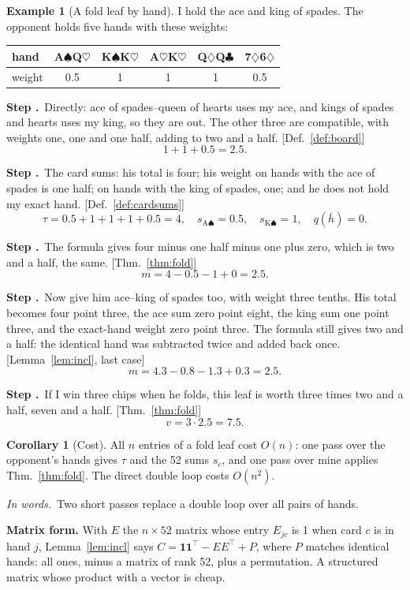 \documentclass[11pt]{article}
\newcommand{\SP}{\ensuremath{\spadesuit}}\newcommand{\HE}{\ensuremath{\heartsuit}}
\newcommand{\DI}{\ensuremath{\diamondsuit}}\newcommand{\CL}{\ensuremath{\clubsuit}}
\newcommand{\one}{\mathbf 1}
\theoremstyle{definition}
\newtheorem{example}[definition]{Example}
\newtheorem{corollary}[definition]{Corollary}
\newcommand{\inwords}{\par\smallskip\noindent\textit{In words.}\ }
\newcounter{stp}
\newcommand{\steps}{\setcounter{stp}{0}}
\newcommand{\st}{\stepcounter{stp}\par\medskip\noindent\textbf{Step \arabic{stp}.}\ }
\newcommand{\by}[1]{\hfill{\small\color{blue!50!black}[#1]}}
\newcommand{\Def}[1]{Def.~\ref{#1}}\newcommand{\Lem}[1]{Lemma~\ref{#1}}\newcommand{\Thm}[1]{Thm.~\ref{#1}}
\begin{document}
\begin{example}[A fold leaf by hand]\label{ex:fold}
I hold the ace and king of spades. The opponent holds five hands with these weights:
\begin{center}\begin{tabular}{lccccc}
\toprule hand & A\SP Q\HE & K\SP K\HE & A\HE K\HE & Q\DI Q\CL & 7\DI 6\DI\\
\midrule weight & 0.5 & 1 & 1 & 1 & 0.5\\ \bottomrule
\end{tabular}\end{center}
\steps
\st Directly: ace of spades--queen of hearts uses my ace, and kings of spades and hearts uses my king, so they are out. The
other three are compatible, with weights one, one and one half, adding to two and a half. \by{\Def{def:board}}
\[ 1+1+0.5=2.5. \]
\st The card sums: his total is four; his weight on hands with the ace of spades is one half; on hands with the king of
spades, one; and he does not hold my exact hand. \by{\Def{def:cardsums}}
\[ \tau=0.5+1+1+1+0.5=4,\quad s_{\text{A}\spadesuit}=0.5,\quad s_{\text{K}\spadesuit}=1,\quad q(\bar h)=0. \]
\st The formula gives four minus one half minus one plus zero, which is two and a half, the same. \by{\Thm{thm:fold}}
\[ m=4-0.5-1+0=2.5. \]
\st Now give him ace--king of spades too, with weight three tenths. His total becomes four point three, the ace sum zero
point eight, the king sum one point three, and the exact-hand weight zero point three. The formula still gives two and a
half: the identical hand was subtracted twice and added back once. \by{\Lem{lem:incl}, last case}
\[ m=4.3-0.8-1.3+0.3=2.5. \]
\st If I win three chips when he folds, this leaf is worth three times two and a half, seven and a half.
\by{\Thm{thm:fold}}
\[ v=3\cdot2.5=7.5. \]
\end{example}

\begin{corollary}[Cost]\label{cor:foldcost}
All $n$ entries of a fold leaf cost $O(n)$: one pass over the opponent's hands gives $\tau$ and the 52 sums $s_c$, and one
pass over mine applies \Thm{thm:fold}. The direct double loop costs $O(n^2)$.
\inwords Two short passes replace a double loop over all pairs of hands.
\end{corollary}
\textbf{Matrix form.} With $E$ the $n\times52$ matrix whose entry $E_{jc}$ is 1 when card $c$ is in hand $j$, \Lem{lem:incl}
says $C=\one\one^\top-EE^\top+P$, where $P$ matches identical hands: all ones, minus a matrix of rank 52, plus a
permutation. A structured matrix whose product with a vector is cheap.
\end{document}
